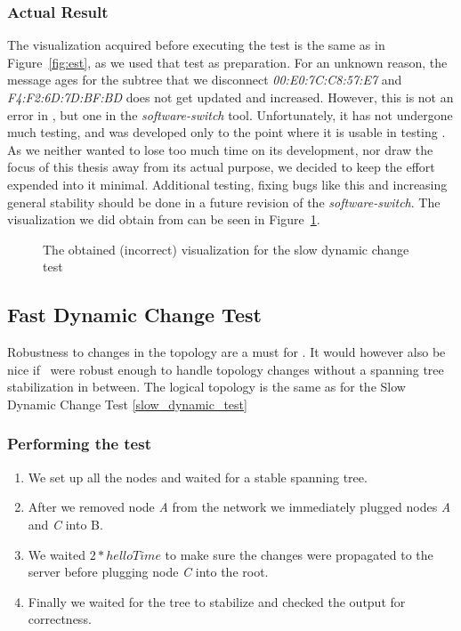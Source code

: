 \subsubsection*{Actual Result}
The visualization acquired before executing the test is the same as in Figure~\ref{fig:est}, as we used that test as preparation.
For an unknown reason, the message ages for the subtree that we disconnect \textit{00:E0:7C:C8:57:E7} and \textit{F4:F2:6D:7D:BF:BD} does not get updated and increased.
However, this is not an error in \tool, but one in the \textit{software-switch} tool.
Unfortunately, it has not undergone much testing, and was developed only to the point where it is usable in testing \tool.
As we neither wanted to lose too much time on its development, nor draw the focus of this thesis away from its actual purpose, we decided to keep the effort expended into it minimal.
Additional testing, fixing bugs like this and increasing general stability should be done in a future revision of the \textit{software-switch}.
The visualization we did obtain from \tool can be seen in Figure~\ref{fig:dynAfter}.
\begin{figure}[h]
    \centering
    \caption{The obtained (incorrect) visualization for the slow dynamic change test}
    \label{fig:dynAfter}
\end{figure}

\subsection*{Fast Dynamic Change Test}
\label{fast_dynamic_test}
Robustness to changes in the topology are a must for \tool.
It would however also be nice if \tool\ were robust enough to handle topology changes without a spanning tree stabilization in between.
The logical topology is the same as for the Slow Dynamic Change Test \ref{slow_dynamic_test}

\subsubsection*{Performing the test}
\begin{enumerate}
    \item We set up all the nodes and waited for a stable spanning tree.
    \item After we removed node \textit{A} from the network we immediately plugged nodes \textit{A} and \textit{C} into B.
    \item We waited $2*helloTime$ to make sure the changes were propagated to the server before plugging node \textit{C} into the root.
    \item Finally we waited for the tree to stabilize and checked the output for correctness.
\end{enumerate}

